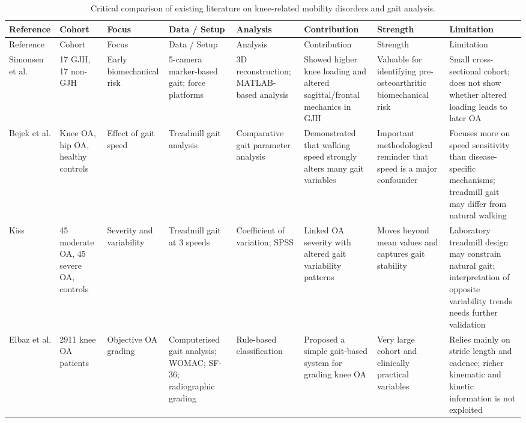 \documentclass[12pt]{elsarticle}
\begin{document}
{\scriptsize
\setlength{\tabcolsep}{2pt}
\renewcommand{\arraystretch}{1.03}
\begin{longtable}{p{1.9cm} p{1.6cm} p{1.9cm} p{1.9cm} p{1.7cm} p{1.9cm} p{2.0cm} p{3.0cm}}
\caption{Critical comparison of existing literature on knee-related mobility disorders and gait analysis.}
\label{knee_critical_extended_summary} \\
\hline
Reference & Cohort & Focus & Data / Setup & Analysis & Contribution & Strength & Limitation \\
\hline
\endfirsthead

\hline
Reference & Cohort & Focus & Data / Setup & Analysis & Contribution & Strength & Limitation \\
\hline
\endhead

Simonsen et al. \cite{simonsen2012gait}
& 17 GJH, 17 non-GJH
& Early biomechanical risk
& 5-camera marker-based gait; force platforms
& 3D reconstruction; MATLAB-based analysis
& Showed higher knee loading and altered sagittal/frontal mechanics in GJH
& Valuable for identifying pre-osteoarthritic biomechanical risk
& Small cross-sectional cohort; does not show whether altered loading leads to later OA \\
\hline

Bejek et al. \cite{bejek2006influence}
& Knee OA, hip OA, healthy controls
& Effect of gait speed
& Treadmill gait analysis
& Comparative gait parameter analysis
& Demonstrated that walking speed strongly alters many gait variables
& Important methodological reminder that speed is a major confounder
& Focuses more on speed sensitivity than disease-specific mechanisms; treadmill gait may differ from natural walking \\
\hline

Kiss \cite{kiss2011effect}
& 45 moderate OA, 45 severe OA, controls
& Severity and variability
& Treadmill gait at 3 speeds
& Coefficient of variation; SPSS
& Linked OA severity with altered gait variability patterns
& Moves beyond mean values and captures gait stability
& Laboratory treadmill design may constrain natural gait; interpretation of opposite variability trends needs further validation \\
\hline

Elbaz et al. \cite{elbaz2014novel}
& 2911 knee OA patients
& Objective OA grading
& Computerised gait analysis; WOMAC; SF-36; radiographic grading
& Rule-based classification
& Proposed a simple gait-based system for grading knee OA
& Very large cohort and clinically practical variables
& Relies mainly on stride length and cadence; richer kinematic and kinetic information is not exploited \\
\hline


\end{longtable}}
\end{document}
